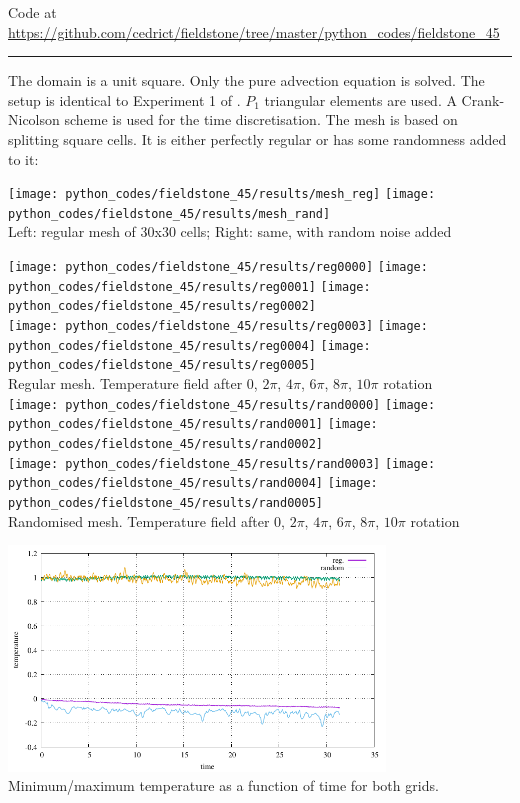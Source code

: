 

\begin{center}
Code at \url{https://github.com/cedrict/fieldstone/tree/master/python_codes/fieldstone_45}
\end{center}

\par\noindent\rule{\textwidth}{0.4pt}


The domain is a unit square. Only the pure advection equation is solved. 
The setup is identical to Experiment 1 of . 
$P_1$ triangular elements are used. A Crank-Nicolson scheme is used for the time
discretisation. The mesh is based on splitting square cells. It is either  
perfectly regular or has some randomness added to it:

\begin{center}
\texttt{[image: python\_codes/fieldstone\_45/results/mesh\_reg]}
\texttt{[image: python\_codes/fieldstone\_45/results/mesh\_rand]}\\
{\captionfont Left: regular mesh of 30x30 cells; Right: same, with random noise added}
\end{center}

\begin{center}
\texttt{[image: python\_codes/fieldstone\_45/results/reg0000]}
\texttt{[image: python\_codes/fieldstone\_45/results/reg0001]}
\texttt{[image: python\_codes/fieldstone\_45/results/reg0002]}\\
\texttt{[image: python\_codes/fieldstone\_45/results/reg0003]}
\texttt{[image: python\_codes/fieldstone\_45/results/reg0004]}
\texttt{[image: python\_codes/fieldstone\_45/results/reg0005]}\\
{\captionfont Regular mesh. Temperature field after 0, $2\pi$, $4\pi$, $6\pi$, $8\pi$, $10\pi$ rotation}\\ 
\texttt{[image: python\_codes/fieldstone\_45/results/rand0000]}
\texttt{[image: python\_codes/fieldstone\_45/results/rand0001]}
\texttt{[image: python\_codes/fieldstone\_45/results/rand0002]}\\
\texttt{[image: python\_codes/fieldstone\_45/results/rand0003]}
\texttt{[image: python\_codes/fieldstone\_45/results/rand0004]}
\texttt{[image: python\_codes/fieldstone\_45/results/rand0005]}\\
{\captionfont Randomised mesh. Temperature field after 0, $2\pi$, $4\pi$, $6\pi$, $8\pi$, $10\pi$ rotation} 
\end{center}

\begin{center}
\includegraphics[width=10cm]{python_codes/fieldstone_45/results/T.pdf}\\
{\captionfont Minimum/maximum temperature as a function of time for both grids.} 
\end{center}
